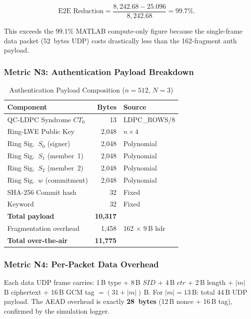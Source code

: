 \documentclass[conference]{IEEEtran}
\newcommand{\SID}{\mathit{SID}}
\begin{document}
\begin{equation}
\text{E2E Reduction} = \frac{8{,}242.68 - 25.096}{8{,}242.68}
= \mathbf{99.7\%}.
\label{eq:e2ered}
\end{equation}

This exceeds the 99.1\% MATLAB compute-only figure because the
single-frame data packet (52~bytes UDP) costs drastically less
than the 162-fragment auth payload.

\subsubsection{Metric N3: Authentication Payload Breakdown}

\begin{table}[t]
\centering
\caption{Authentication Payload Composition ($n{=}512$, $N{=}3$)}
\label{tab:authpayload}
\renewcommand{\arraystretch}{1.1}
\begin{tabular}{lrl}
\toprule
\textbf{Component} & \textbf{Bytes} & \textbf{Source} \\
\midrule
QC-LDPC Syndrome $CT_0$ & 13 & LDPC\_ROWS/8 \\
Ring-LWE Public Key & 2,048 & $n \times 4$ \\
Ring Sig.\ $S_0$ (signer) & 2,048 & Polynomial \\
Ring Sig.\ $S_1$ (member~1) & 2,048 & Polynomial \\
Ring Sig.\ $S_2$ (member~2) & 2,048 & Polynomial \\
Ring Sig.\ $w$ (commitment) & 2,048 & Polynomial \\
SHA-256 Commit hash & 32 & Fixed \\
Keyword & 32 & Fixed \\
\midrule
\textbf{Total payload} & \textbf{10,317} & \\
Fragmentation overhead & 1,458 & 162 $\times$ 9\,B hdr \\
\textbf{Total over-the-air} & \textbf{11,775} & \\
\bottomrule
\end{tabular}
\end{table}

\subsubsection{Metric N4: Per-Packet Data Overhead}

Each data UDP frame carries: 1\,B type + 8\,B $\SID$ + 4\,B $ctr$
+ 2\,B length + $|m|$\,B ciphertext + 16\,B GCM tag
$= (31 + |m|)$\,B. For $|m| = 13$\,B: total 44\,B UDP payload.
The AEAD overhead is exactly \textbf{28~bytes}
(12\,B nonce + 16\,B tag), confirmed by the simulation logger.
\end{document}
